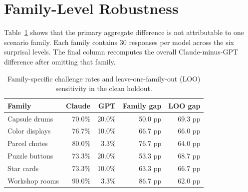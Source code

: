 \documentclass[11pt]{article}
\begin{document}
\section{Family-Level Robustness}
\label{sec:family_robustness}

Table~\ref{tab:family_robustness} shows that the primary aggregate difference is not attributable to one scenario family. Each family contains 30 responses per model across the six surprisal levels. The final column recomputes the overall Claude-minus-GPT difference after omitting that family.

\begin{table}[H]
\centering
\caption{Family-specific challenge rates and leave-one-family-out (LOO) sensitivity in the clean holdout.}
\label{tab:family_robustness}
\begin{tabular}{lrrrr}
\toprule
Family & Claude & GPT & Family gap & LOO gap \\
\midrule
Capsule drums & 70.0\% & 20.0\% & 50.0 pp & 69.3 pp \\
Color displays & 76.7\% & 10.0\% & 66.7 pp & 66.0 pp \\
Parcel chutes & 80.0\% & 3.3\% & 76.7 pp & 64.0 pp \\
Puzzle buttons & 73.3\% & 20.0\% & 53.3 pp & 68.7 pp \\
Star cards & 73.3\% & 10.0\% & 63.3 pp & 66.7 pp \\
Workshop rooms & 90.0\% & 3.3\% & 86.7 pp & 62.0 pp \\
\bottomrule
\end{tabular}
\end{table}
\end{document}
